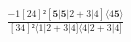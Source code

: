 \documentclass[varwidth, border=5pt]{standalone}
\begin{document}
\begin{my}
$\begin{gathered}
\scriptscriptstyle\frac{-1[24]²[𝟓|𝟓|2+3|4]⟨4𝟓⟩}{[34]²⟨1|2+3|4]⟨4|2+3|4]}
\end{gathered}$
\end{my}
\end{document}
